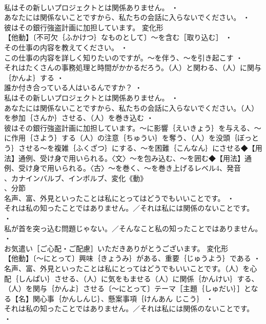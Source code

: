 \documentclass[8pt]{extreport}
\begin{document}
\begin{CJK}{UTF8}{min}
\\	私はその新しいプロジェクトとは関係ありません。 ・
\\	あなたには関係ないことですから、私たちの会話に入らないでください。 ・
\\	彼はその銀行強盗計画に加担しています。	変化形 
\\	【他動】〔不可欠｛ふかけつ｝なものとして〕～を含む［取り込む］ ・
\\	その仕事の内容を教えてください。 ・
\\	この仕事の内容を詳しく知りたいのですが。～を伴う、～を引き起こす ・
\\	それはたくさんの事務処理と時間がかかるだろう。（人）と関わる、（人）に関与｛かんよ｝する ・
\\	誰か付き合っている人はいるんですか？ ・
\\	私はその新しいプロジェクトとは関係ありません。 ・
\\	あなたには関係ないことですから、私たちの会話に入らないでください。（人）を参加｛さんか｝させる、（人）を巻き込む ・
\\	彼はその銀行強盗計画に加担しています。～に影響｛えいきょう｝を与える、～に作用｛さよう｝する（人）の注意｛ちゅうい｝を奪う、（人）を没頭｛ぼっとう｝させる～を複雑｛ふくざつ｝にする、～を困難｛こんなん｝にさせる◆【用法】通例、受け身で用いられる。〈文〉～を包み込む、～を囲む◆【用法】通例、受け身で用いられる。〈古〉～を巻く、～を巻き上げるレベル4、発音
\\	、カナインバルブ、インボルブ、変化《動》
\\	、分節
\\	名声、富、外見といったことは私にとってはどうでもいいことです。 ・
\\	それは私の知ったことではありません。／それは私には関係のないことです。 ・
\\	私が首を突っ込む問題じゃない。／そんなこと私の知ったことではありません。 ・
\\	お気遣い［ご心配・ご配慮］いただきありがとうございます。	変化形 
\\	【他動】〔～にとって〕興味｛きょうみ｝がある、重要｛じゅうよう｝である ・
\\	名声、富、外見といったことは私にとってはどうでもいいことです。（人）を心配｛しんぱい｝させる、（人）に気をもませる（人）に関係｛かんけい｝する、（人）を関与｛かんよ｝させる〔～にとって〕テーマ［主題｛しゅだい｝］となる【名】関心事｛かんしんじ｝、懸案事項｛けんあん じこう｝ ・
\\	それは私の知ったことではありません。／それは私には関係のないことです。 ・

\end{CJK}
\end{document}

